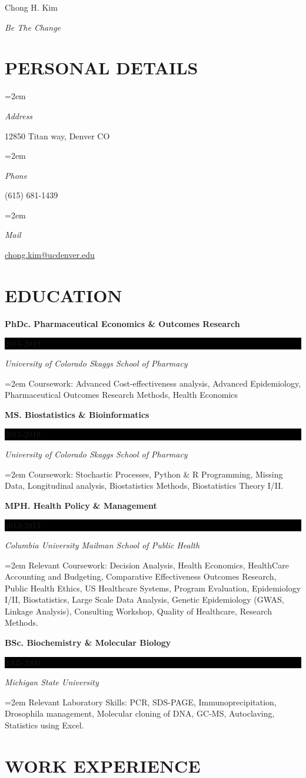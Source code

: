 \documentclass[paper=a4,fontsize=11pt]{scrartcl} %
\newlength{\spacebox}
\newcommand{\sepspace}{\vspace*{1em}}		%
\newcommand{\MyName}[1]{ %
		\Huge \usefont{OT1}{phv}{b}{n} \hfill #1
		\par \normalsize \normalfont}
\newcommand{\MySlogan}[1]{ %
		\large \usefont{OT1}{phv}{m}{n}\hfill \textit{#1}
		\par \normalsize \normalfont}
\newcommand{\NewPart}[1]{\section*{\uppercase{#1}}}
\newcommand{\PersonalEntry}[2]{
		\noindent\hangindent=2em\hangafter=0 %
		\parbox{\spacebox}{        %
		\textit{#1}}		       %
		\hspace{1.5em} #2 \par}    %
\newcommand{\EducationEntry}[4]{
		\noindent \textbf{#1} \hfill      %
		\colorbox{Black}{%
			\parbox{6em}{%
			\hfill\color{White}#2}} \par  %
		\noindent \textit{#3} \par        %
		\noindent\hangindent=2em\hangafter=0 \small #4 %
		\normalsize \par}
\begin{document}
\MyName{Chong H. Kim}
\MySlogan{Be The Change}

\sepspace

\NewPart{Personal details}{}

\PersonalEntry{Address}{12850 Titan way, Denver CO}
\PersonalEntry{Phone}{(615) 681-1439}
\PersonalEntry{Mail}{\url{chong.kim@ucdenver.edu}}

\NewPart{Education}{}

\EducationEntry{PhDc. Pharmaceutical Economics \& Outcomes Research}{2015-2019}{University of Colorado Skaggs School of Pharmacy}{Coursework: Advanced Cost-effectiveness analysis, Advanced Epidemiology, Pharmaceutical Outcomes Research Methods, Health Economics}
\sepspace

\EducationEntry{MS. Biostatistics \& Bioinformatics}{2015-2019}{University of Colorado Skaggs School of Pharmacy}{Coursework: Stochastic Processes, Python \& R Programming, Missing Data, Longitudinal analysis, Biostatistics Methods, Biostatistics Theory I/II.}
\sepspace

\EducationEntry{MPH. Health Policy \& Management}{2012-2013}{Columbia University Mailman School of Public Health}{Relevant Coursework: Decision Analysis, Health Economics, HealthCare Accounting and Budgeting, Comparative Effectiveness Outcomes Research, Public Health Ethics, US Healthcare Systems, Program Evaluation, Epidemiology I/II, Biostatistics, Large Scale Data Analysis, Genetic Epidemiology (GWAS, Linkage Analysis), Consulting Workshop, Quality of Healthcare, Research Methods.}
\sepspace


\EducationEntry{BSc. Biochemistry \& Molecular Biology}{2005-2009}{Michigan State University}{Relevant Laboratory Skills: PCR, SDS-PAGE, Immunoprecipitation, Drosophila management, Molecular cloning of DNA, GC-MS, Autoclaving, Statistics using Excel.}

\NewPart{Work experience}{}
\end{document}
